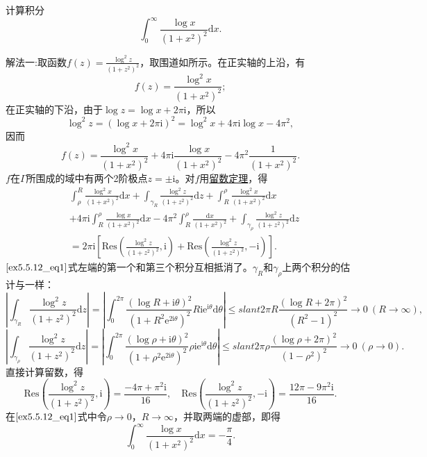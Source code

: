 \documentclass[../../main.tex]{subfiles}
\begin{document}
\begin{example}
计算积分
\[
\int_{0}^{\infty} \frac{\log x}{(1 + x^2)^2} \mathrm{d}x.
\]
\end{example}
\begin{solution}
{\color{blue}解法一:}取函数\( f(z) = \frac{\log^2 z}{(1 + z^2)^2} \)，取围道如所示。在正实轴的上沿，有
\[
f(z) = \frac{\log^2 x}{(1 + x^2)^2};
\]
在正实轴的下沿，由于\( \log z = \log x + 2\pi \mathrm{i} \)，所以
\[
\log^2 z = (\log x + 2\pi \mathrm{i})^2
= \log^2 x + 4\pi \mathrm{i} \log x - 4\pi^2,
\]
因而
\[
f(z) = \frac{\log^2 x}{(1 + x^2)^2} + 4\pi \mathrm{i} \frac{\log x}{(1 + x^2)^2} - 4\pi^2 \frac{1}{(1 + x^2)^2}.
\]
\( f \)在\( \Gamma \)所围成的域中有两个2阶极点\( z = \pm \mathrm{i} \)。对\( f \)用\hyperref[theorem:留数定理(残数定理)-定理5.4.9]{留数定理}，得
\begin{align}
&\int_{\rho}^{R} \frac{\log^2 x}{(1 + x^2)^2} \mathrm{d}x + \int_{\gamma_R} \frac{\log^2 z}{(1 + z^2)^2} \mathrm{d}z + \int_{R}^{\rho} \frac{\log^2 x}{(1 + x^2)^2} \mathrm{d}x
\nonumber\\
&+ 4\pi \mathrm{i} \int_{R}^{\rho} \frac{\log x}{(1 + x^2)^2} \mathrm{d}x - 4\pi^2 \int_{R}^{\rho} \frac{\mathrm{d}x}{(1 + x^2)^2} + \int_{\gamma_{\rho}} \frac{\log^2 z}{(1 + z^2)^2} \mathrm{d}z
\nonumber\\
&= 2\pi \mathrm{i} \left[ \mathrm{Res}\left( \frac{\log^2 z}{(1 + z^2)^2}, \mathrm{i} \right) + \mathrm{Res}\left( \frac{\log^2 z}{(1 + z^2)^2}, -\mathrm{i} \right) \right]. \label{ex5.5.12_eq1}
\end{align}
\(\eqref{ex5.5.12_eq1}\)式左端的第一个和第三个积分互相抵消了。\( \gamma_R \)和\( \gamma_{\rho} \)上两个积分的估计与一样：
\[
\left| \int_{\gamma_R} \frac{\log^2 z}{(1 + z^2)^2} \mathrm{d}z \right| = \left| \int_{0}^{2\pi} \frac{(\log R + \mathrm{i}\theta)^2}{(1 + R^2 \mathrm{e}^{2\mathrm{i}\theta})^2} R\mathrm{i}\mathrm{e}^{\mathrm{i}\theta} \mathrm{d}\theta \right|
\leqslant slant 2\pi R \frac{(\log R + 2\pi)^2}{(R^2 - 1)^2}
\to 0 \ (R \to \infty),
\]
\[
\left| \int_{\gamma_{\rho}} \frac{\log^2 z}{(1 + z^2)^2} \mathrm{d}z \right| = \left| \int_{0}^{2\pi} \frac{(\log \rho + \mathrm{i}\theta)^2}{(1 + \rho^2 \mathrm{e}^{2\mathrm{i}\theta})^2} \rho\mathrm{i}\mathrm{e}^{\mathrm{i}\theta} \mathrm{d}\theta \right|
\leqslant slant 2\pi \rho \frac{(\log \rho + 2\pi)^2}{(1 - \rho^2)^2}
\to 0 \ (\rho \to 0).
\]
直接计算留数，得
\[
\mathrm{Res}\left( \frac{\log^2 z}{(1 + z^2)^2}, \mathrm{i} \right) = \frac{-4\pi + \pi^2 \mathrm{i}}{16},
\quad
\mathrm{Res}\left( \frac{\log^2 z}{(1 + z^2)^2}, -\mathrm{i} \right) = \frac{12\pi - 9\pi^2 \mathrm{i}}{16}.
\]
在\(\eqref{ex5.5.12_eq1}\)式中令\( \rho \to 0 \)，\( R \to \infty \)，并取两端的虚部，即得
\[
\int_{0}^{\infty} \frac{\log x}{(1 + x^2)^2} \mathrm{d}x = -\frac{\pi}{4}.
\]


\end{solution}
\end{document}
